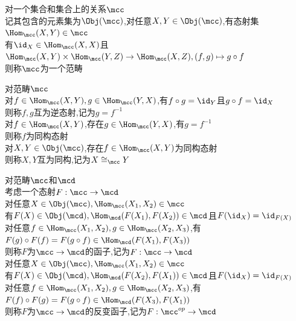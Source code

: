 

%

\setcounter{section}{0}
\setcounter{subsection}{0}

\begin{dingyi}
对一个集合和集合上的关系$\mcc$\\
记其包含的元素集为$\Obj(\mcc)$,对任意$X,Y\in \Obj(\mcc)$,有态射集$\Hom_{\mcc}(X,Y)\in\mcc$\\
有$\id_{X}\in \Hom_{\mcc}(X,X)$且$\Hom_{\mcc}(X,Y)\times\Hom_{\mcc}(Y,Z)\to \Hom_{\mcc}(X,Z),(f,g)\mapsto g\circ f$\\
则称$\mcc$为一个范畴
\end{dingyi}

\begin{dingyi}
对范畴$\mcc$\\
对$f\in\Hom_{\mcc}(X,Y),g\in\Hom_{\mcc}(Y,X)$,有$f\circ g=\id_{Y}$且$g\circ f=\id_{X}$\\
则称$f,g$互为逆态射,记为$g=f^{-1}$\\
对$f\in\Hom_{\mcc}(X,Y)$,存在$g\in\Hom_{\mcc}(Y,X)$,有$g=f^{-1}$\\
则称$f$为同构态射\\
对$X,Y\in\Obj(\mcc)$,存在$f\in\Hom_{\mcc}(X,Y)$为同构态射\\
则称$X,Y$互为同构,记为$X\cong_{\mcc} Y$
\end{dingyi}

\begin{dingyi}
对范畴$\mcc$和$\mcd$\\
考虑一个态射$F:\mcc\to\mcd$\\
对任意$X\in\Obj(\mcc),\Hom_{\mcc}(X_1,X_2)\in\mcc$\\
有$F(X)\in\Obj(\mcd),\Hom_{\mcd}(F(X_1),F(X_2))\in \mcd$且$F(\id_{X})=\id_{F(X)}$\\
对任意$f\in \Hom_{\mcc}(X_1,X_2),g\in \Hom_{\mcc}(X_2,X_3)$,有$F(g)\circ F(f)=F(g\circ f)\in \Hom_{\mcd}(F(X_1),F(X_3))$\\
则称$F$为$\mcc\to\mcd$的函子,记为$F:\mcc\to\mcd$\\
对任意$X\in\Obj(\mcc),\Hom_{\mcc}(X_1,X_2)\in\mcc$\\
有$F(X)\in\Obj(\mcd),\Hom_{\mcd}(F(X_2),F(X_1))\in \mcd$且$F(\id_{X})=\id_{F(X)}$\\
对任意$f\in \Hom_{\mcc}(X_1,X_2),g\in \Hom_{\mcc}(X_2,X_3)$,有$F(f)\circ F(g)=F(g\circ f)\in \Hom_{\mcd}(F(X_3),F(X_1))$\\
则称$F$为$\mcc\to\mcd$的反变函子,记为$F:\mcc^{op}\to\mcd$
\end{dingyi}

